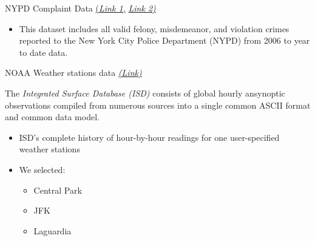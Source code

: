 \documentclass[10pt,ignorenonframetext,]{beamer}
\providecommand{\tightlist}{%
  \setlength{\itemsep}{0pt}\setlength{\parskip}{0pt}}
\begin{document}
\begin{frame}

\begin{block}{NYPD Complaint Data
\href{https://data.cityofnewyork.us/Public-Safety/NYPD-Complaint-Data-Historic/qgea-i56i}{(\emph{Link
1,}}
\href{https://data.cityofnewyork.us/Public-Safety/NYPD-Complaint-Data-Current-YTD/5uac-w243}{\emph{Link
2)}}}

\begin{itemize}
\tightlist
\item
  This dataset includes all valid felony, misdemeanor, and violation
  crimes reported to the New York City Police Department (NYPD) from
  2006 to year to date data.
\end{itemize}

\end{block}

\begin{block}{NOAA Weather stations data
\href{https://www.ncdc.noaa.gov/isd}{\emph{(Link)}}}

The \emph{Integrated Surface Database (ISD)} consists of global hourly
ansynoptic observations compiled from numerous sources into a single
common ASCII format and common data model.

\begin{itemize}
\item
  ISD’s complete history of hour-by-hour readings for one user-specified
  weather stations
\item
  We selected:

  \begin{itemize}
  \tightlist
  \item
    Central Park
  \item
    JFK
  \item
    Laguardia
  \end{itemize}
\end{itemize}

\end{block}

\end{frame}
\end{document}
